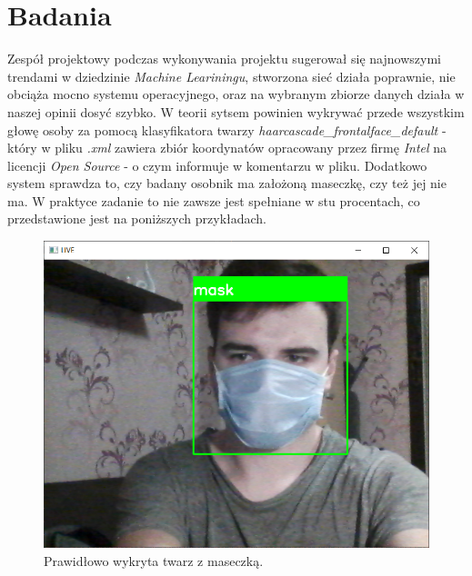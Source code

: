 \documentclass[12pt,a4paper]{article}
\begin{document}
\section{Badania}
Zespół projektowy podczas wykonywania projektu sugerował się najnowszymi trendami w dziedzinie \textit{Machine Leariningu}, stworzona sieć działa poprawnie, nie obciąża mocno systemu operacyjnego, oraz na wybranym zbiorze danych działa w naszej opinii dosyć szybko. W teorii sytsem powinien wykrywać przede wszystkim głowę osoby za pomocą klasyfikatora twarzy \textit{haarcascade\_frontalface\_default} - który w pliku \textit{.xml} zawiera zbiór koordynatów opracowany przez firmę \textit{Intel} na licencji \textit{Open Source} - o czym informuje w komentarzu w pliku. Dodatkowo system sprawdza to, czy badany osobnik ma założoną maseczkę, czy też jej nie ma. W praktyce zadanie to nie zawsze jest spełniane w stu procentach, co przedstawione jest na poniższych przykładach.

\begin{figure}[h!]
    \centering
    \includegraphics[scale = 0.38]{media/true_z.png}
    \caption{Prawidłowo wykryta twarz z maseczką.}
    \label{fig:Rysunek1}
\end{figure}
\end{document}
